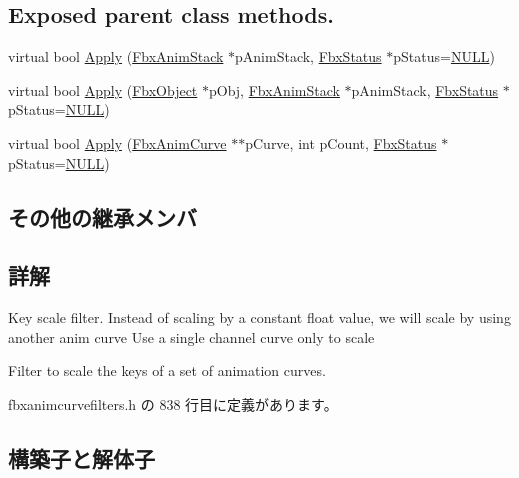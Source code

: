 \subsection*{Exposed parent class methods.}
\begin{DoxyCompactItemize}
\item 
virtual bool \hyperlink{class_fbx_anim_curve_filter_scale_by_curve_a6a1c172a82c4e5e2263d388c74ec9dba}{Apply} (\hyperlink{class_fbx_anim_stack}{Fbx\+Anim\+Stack} $\ast$p\+Anim\+Stack, \hyperlink{class_fbx_status}{Fbx\+Status} $\ast$p\+Status=\hyperlink{fbxarch_8h_a070d2ce7b6bb7e5c05602aa8c308d0c4}{N\+U\+LL})
\item 
virtual bool \hyperlink{class_fbx_anim_curve_filter_scale_by_curve_a7212a7c70bb1c0ae8f7c82c25de17745}{Apply} (\hyperlink{class_fbx_object}{Fbx\+Object} $\ast$p\+Obj, \hyperlink{class_fbx_anim_stack}{Fbx\+Anim\+Stack} $\ast$p\+Anim\+Stack, \hyperlink{class_fbx_status}{Fbx\+Status} $\ast$p\+Status=\hyperlink{fbxarch_8h_a070d2ce7b6bb7e5c05602aa8c308d0c4}{N\+U\+LL})
\item 
virtual bool \hyperlink{class_fbx_anim_curve_filter_scale_by_curve_a8fc0bda8ff0cabcd9a424e06ca646581}{Apply} (\hyperlink{class_fbx_anim_curve}{Fbx\+Anim\+Curve} $\ast$$\ast$p\+Curve, int p\+Count, \hyperlink{class_fbx_status}{Fbx\+Status} $\ast$p\+Status=\hyperlink{fbxarch_8h_a070d2ce7b6bb7e5c05602aa8c308d0c4}{N\+U\+LL})
\end{DoxyCompactItemize}
\subsection*{その他の継承メンバ}


\subsection{詳解}
Key scale filter. Instead of scaling by a constant float value, we will scale by using another anim curve Use a single channel curve only to scale

Filter to scale the keys of a set of animation curves. 

 fbxanimcurvefilters.\+h の 838 行目に定義があります。



\subsection{構築子と解体子}
\mbox{\label{class_fbx_anim_curve_filter_scale_by_curve_a88a350e3639a1fcb3aa29a071fe0fa71}} 
